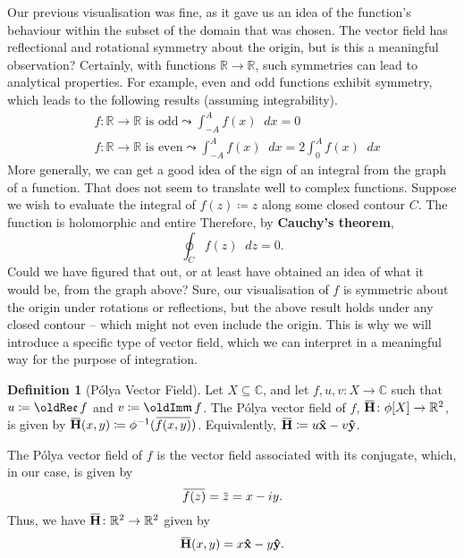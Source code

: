 \documentclass[a4paper]{article}
\newcommand*\diff{\mathop{}\!d} %
\newcommand{\R}{\mathbb{R}}
\newcommand{\C}{\mathbb{C}}
\renewcommand{\Im}{\mathop{\oldIm\mathfrak{m}}}
\renewcommand{\Re}{\mathop{\oldRe\mathfrak{e}}}
\newcommand{\overbar}[1]{\mkern 1.5mu\overline{\mkern-1.5mu#1\mkern-1.5mu}\mkern 1.5mu}
\theoremstyle{definition}
\newtheorem{definition}{Definition}
\begin{document}
Our previous visualisation was fine, as it gave us an idea of the function's behaviour within the subset of the domain that was chosen.
The vector field has reflectional and rotational symmetry about the origin, but is this a meaningful observation?
Certainly, with functions $\R \to \R$, such symmetries can lead to analytical properties.
For example, even and odd functions exhibit symmetry, which leads to the following results (assuming integrability).
\begin{align*}
     & f \colon \R \to \R \text{ is odd} \leadsto \int_{-A}^{A} f(x) \diff x = 0                            \\
     & f \colon \R \to \R \text{ is even} \leadsto \int_{-A}^{A} f(x) \diff x = 2 \int_{0}^{A} f(x) \diff x
\end{align*}
More generally, we can get a good idea of the sign of an integral from the graph of a function.
That does not seem to translate well to complex functions.
Suppose we wish to evaluate the integral of $f(z) \coloneq z$ along some closed contour $C$.
The function is holomorphic and entire
Therefore, by \textbf{Cauchy's theorem},
\begin{equation*}
    \oint_C f(z) \diff z = 0.
\end{equation*}
Could we have figured that out, or at least have obtained an idea of what it would be, from the graph above?
Sure, our visualisation of $f$ is symmetric about the origin under rotations or reflections, but the above result holds under any closed contour -- which might not even include the origin.
This is why we will introduce a specific type of vector field, which we can interpret in a meaningful way for the purpose of integration.
\begin{definition}[P\'olya Vector Field]
    Let $X \subseteq \C$, and let $f,u,v \colon X \to \C$ such that $u \coloneq \Re f$ and $v \coloneq \Im f$.
    The P\'olya vector field of $f$, $\mathbf{\overbar{H}} \colon \phi[X] \to \R^2$, is given by $\mathbf{\overbar{H}} (x,y) \coloneq \phi^{-1}(\overbar{f(x,y)})$.
    Equivalently, $\mathbf{\overbar{H}} \coloneq u\mathbf{\hat{x}} - v\mathbf{\hat{y}}$.
\end{definition}
The P\'olya vector field of $f$ is the vector field associated with its conjugate, which, in our case, is given by
\begin{equation*}
    \overbar{f(z)} = \overbar{z} = x - iy.
\end{equation*}
Thus, we have $\mathbf{\overbar{H}} \colon \R^2 \to \R^2$ given by
\begin{equation*}
    \mathbf{\overbar{H}}(x,y) = x \mathbf{\hat{x}} - y \mathbf{\hat{y}}.
\end{equation*}
\end{document}
